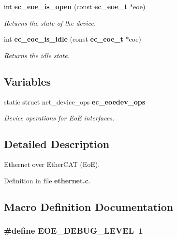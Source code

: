 \begin{DoxyCompactItemize}
int {\bf ec\-\_\-eoe\-\_\-is\-\_\-open} (const {\bf ec\-\_\-eoe\-\_\-t} $\ast$eoe)
\begin{DoxyCompactList}\small\item\em Returns the state of the device. \end{DoxyCompactList}\item 
int {\bf ec\-\_\-eoe\-\_\-is\-\_\-idle} (const {\bf ec\-\_\-eoe\-\_\-t} $\ast$eoe)
\begin{DoxyCompactList}\small\item\em Returns the idle state. \end{DoxyCompactList}\end{DoxyCompactItemize}
\subsection*{Variables}
\begin{DoxyCompactItemize}
\item 
static struct net\-\_\-device\-\_\-ops {\bf ec\-\_\-eoedev\-\_\-ops}
\begin{DoxyCompactList}\small\item\em Device operations for Eo\-E interfaces. \end{DoxyCompactList}\end{DoxyCompactItemize}


\subsection{Detailed Description}
Ethernet over Ether\-C\-A\-T (Eo\-E). 

Definition in file {\bf ethernet.\-c}.



\subsection{Macro Definition Documentation}
\subsubsection[{E\-O\-E\-\_\-\-D\-E\-B\-U\-G\-\_\-\-L\-E\-V\-E\-L}]{\setlength{\rightskip}{0pt plus 5cm}\#define E\-O\-E\-\_\-\-D\-E\-B\-U\-G\-\_\-\-L\-E\-V\-E\-L~1}\label{ethernet_8c_a6e67793856d7614e89ecdf6bd55c59de}


